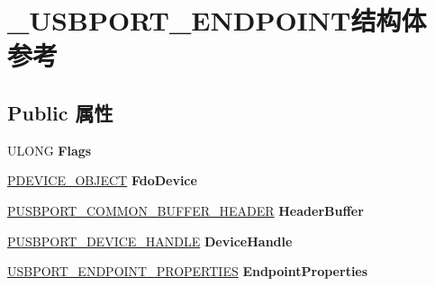 \hypertarget{struct___u_s_b_p_o_r_t___e_n_d_p_o_i_n_t}{}\section{\+\_\+\+U\+S\+B\+P\+O\+R\+T\+\_\+\+E\+N\+D\+P\+O\+I\+N\+T结构体 参考}
\label{struct___u_s_b_p_o_r_t___e_n_d_p_o_i_n_t}
\subsection*{Public 属性}
\begin{DoxyCompactItemize}
\item 
\mbox{\label{struct___u_s_b_p_o_r_t___e_n_d_p_o_i_n_t_a470a5548b515e4fd9f5062d01e205e3c}} 
U\+L\+O\+NG {\bfseries Flags}
\item 
\mbox{\label{struct___u_s_b_p_o_r_t___e_n_d_p_o_i_n_t_a3e2863bdd322c90117ae94bfeb81567d}} 
\hyperlink{struct___d_e_v_i_c_e___o_b_j_e_c_t}{P\+D\+E\+V\+I\+C\+E\+\_\+\+O\+B\+J\+E\+CT} {\bfseries Fdo\+Device}
\item 
\mbox{\label{struct___u_s_b_p_o_r_t___e_n_d_p_o_i_n_t_ae935e9de9790c6cab06da27bbdfa0ed9}} 
\hyperlink{struct___u_s_b_p_o_r_t___c_o_m_m_o_n___b_u_f_f_e_r___h_e_a_d_e_r}{P\+U\+S\+B\+P\+O\+R\+T\+\_\+\+C\+O\+M\+M\+O\+N\+\_\+\+B\+U\+F\+F\+E\+R\+\_\+\+H\+E\+A\+D\+ER} {\bfseries Header\+Buffer}
\item 
\mbox{\label{struct___u_s_b_p_o_r_t___e_n_d_p_o_i_n_t_a0bf2743a9423e67e6621ff45e4689d73}} 
\hyperlink{struct___u_s_b_p_o_r_t___d_e_v_i_c_e___h_a_n_d_l_e}{P\+U\+S\+B\+P\+O\+R\+T\+\_\+\+D\+E\+V\+I\+C\+E\+\_\+\+H\+A\+N\+D\+LE} {\bfseries Device\+Handle}
\item 
\mbox{\label{struct___u_s_b_p_o_r_t___e_n_d_p_o_i_n_t_ad279c1208a898a8069a96cf6d583a15f}} 
\hyperlink{struct___u_s_b_p_o_r_t___e_n_d_p_o_i_n_t___p_r_o_p_e_r_t_i_e_s}{U\+S\+B\+P\+O\+R\+T\+\_\+\+E\+N\+D\+P\+O\+I\+N\+T\+\_\+\+P\+R\+O\+P\+E\+R\+T\+I\+ES} {\bfseries Endpoint\+Properties}
\item 
\mbox{\label{struct___u_s_b_p_o_r_t___e_n_d_p_o_i_n_t_a6286cdff4cd6138fd0b4f3bef0790f3f}} 

\end{DoxyCompactItemize}

